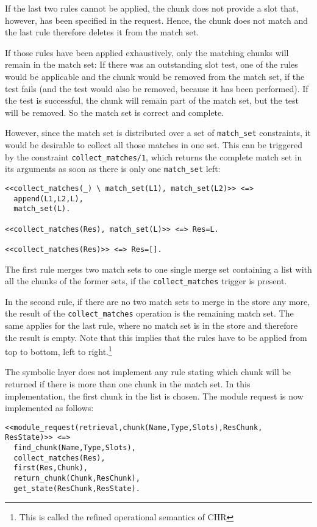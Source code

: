 If the last two rules cannot be applied, the chunk does not provide a slot that, however, has been specified in the request. Hence, the chunk does not match and the last rule therefore deletes it from the match set. 

If those rules have been applied exhaustively, only the matching chunks will remain in the match set: If there was an outstanding slot test, one of the rules would be applicable and the chunk would be removed from the match set, if the test fails (and the test would also be removed, because it has been performed). If the test is successful, the chunk will remain part of the match set, but the test will be removed. So the match set is correct and complete.

However, since the match set is distributed over a set of \lstinline|match_set| constraints, it would be desirable to collect all those matches in one set. This can be triggered by the constraint \lstinline|collect_matches/1|, which returns the complete match set in its arguments as soon as there is only one \lstinline|match_set| left:

\begin{lstlisting}
<<collect_matches(_) \ match_set(L1), match_set(L2)>> <=> 
  append(L1,L2,L), 
  match_set(L).
  
<<collect_matches(Res), match_set(L)>> <=> Res=L.

<<collect_matches(Res)>> <=> Res=[].
\end{lstlisting}

The first rule merges two match sets to one single merge set containing a list with all the chunks of the former sets, if the \lstinline|collect_matches| trigger is present. 

In the second rule, if there are no two match sets to merge in the store any more, the result of the \lstinline|collect_matches| operation is the remaining match set. The same applies for the last rule, where no match set is in the store and therefore the result is empty. Note that this implies that the rules have to be applied from top to bottom, left to right.\footnote{This is called the refined operational semantics of CHR}

The symbolic layer does not implement any rule stating which chunk will be returned if there is more than one chunk in the match set. In this implementation, the first chunk in the list is chosen. The module request is now implemented as follows:

\begin{lstlisting}
<<module_request(retrieval,chunk(Name,Type,Slots),ResChunk, ResState)>> <=> 
  find_chunk(Name,Type,Slots),
  collect_matches(Res),
  first(Res,Chunk),
  return_chunk(Chunk,ResChunk),
  get_state(ResChunk,ResState).
\end{lstlisting}

